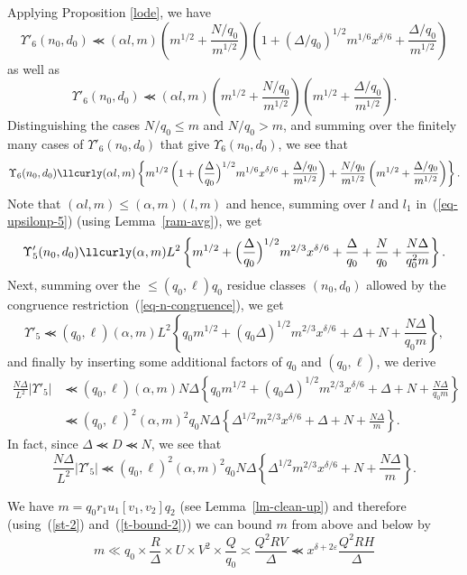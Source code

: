 \documentclass[12pt,a4paper,reqno]{amsart}
\numberwithin{equation}{section}
\theoremstyle{plain}
\theoremstyle{definition}
\newcommand\eps{\varepsilon}
\renewcommand{\sim}{\asymp}
\renewcommand{\lessapprox}{\llcurly}
\begin{document}
Applying Proposition \ref{lode}, we have
$$
\Upsilon'_6(n_0,d_0)\lessapprox (\alpha l,m) \left(m^{1/2} +
  \frac{N/q_0}{m^{1/2}}\right) \left( 1 + (\Delta/q_0)^{1/2} m^{1/6}
  x^{\delta/6} + \frac{\Delta/q_0}{m^{1/2}}\right)
$$
as well as
$$
\Upsilon'_6(n_0,d_0)\lessapprox (\alpha l,m) \left(m^{1/2} +
  \frac{N/q_0}{m^{1/2}}\right) \left(m^{1/2} +
  \frac{\Delta/q_0}{m^{1/2}}\right).
$$ 
Distinguishing the cases $N/q_0 \leq m$ and $N/q_0 > m$, and summing
over the finitely many cases of $\Upsilon'_6(n_0,d_0)$ that give
$\Upsilon_6(n_0,d_0)$, we see that
$$
\Upsilon_6(n_0,d_0)\lessapprox (\alpha l,m) \left\{ m^{1/2} \left( 1 +
    \Bigl(\frac{\Delta}{q_0}\Bigr)^{1/2} m^{1/6} x^{\delta/6} +
    \frac{\Delta/q_0}{m^{1/2}}\right) + \frac{N/q_0}{m^{1/2}}
  \left(m^{1/2} + \frac{\Delta/q_0}{m^{1/2}}\right)\right\}.
$$
Note that $(\alpha l,m)\leq (\alpha,m)(l,m)$ and hence, summing over $l$ and
$l_1$ in~(\ref{eq-upsilonp-5}) (using Lemma~\ref{ram-avg}), we get
$$
\Upsilon'_5(n_0,d_0)\lessapprox (\alpha,m)L^2 \left\{ m^{1/2} +
  \Bigl(\frac{\Delta}{q_0}\Bigr)^{1/2} m^{2/3} x^{\delta/6} +
  \frac{\Delta}{q_0} + \frac{N}{q_0} + \frac{N\Delta}{q_0^2m}\right\}.
$$
Next, summing over the $\leq (q_0,\ell)q_0$ residue classes $(n_0,d_0)$
allowed by the congruence restriction~(\ref{eq-n-congruence}), we get
$$
\Upsilon'_5\lessapprox (q_0,\ell)
(\alpha,m)L^2 \left\{ q_0m^{1/2} + (q_0\Delta)^{1/2} m^{2/3} x^{\delta/6} +
  \Delta + N + \frac{N\Delta}{q_0m}\right\},
$$
and finally by  inserting some additional factors of $q_0$ and $(q_0,\ell)$, we derive
\begin{align*}
\frac{N\Delta}{L^2} | \Upsilon'_5| &\lessapprox (q_0,\ell)(\alpha,m)N\Delta \left\{ q_0m^{1/2} +
    (q_0\Delta)^{1/2} m^{2/3} x^{\delta/6} + \Delta + N +
    \frac{N\Delta}{q_0m}\right\}\\
  &\lessapprox (q_0,\ell)^2(\alpha,m)^2q_0N\Delta \left\{ \Delta^{1/2}
    m^{2/3} x^{\delta/6} + \Delta + N + \frac{N\Delta}{m}\right\}.
\end{align*}
In fact, since $\Delta \lessapprox D \lessapprox N$, we see
that
$$
\frac{N\Delta}{L^2} | \Upsilon'_5| \lessapprox (q_0,\ell)^2(\alpha,m)^2q_0N\Delta \left\{
  \Delta^{1/2} m^{2/3} x^{\delta/6} + N + \frac{N\Delta}{m}\right\}.
$$
\par
We have $m=q_0r_1u_1[v_1,v_2]q_2$ (see Lemma~\ref{lm-clean-up}) and
therefore (using~(\ref{st-2}) and~(\ref{t-bound-2})) we can bound $m$
from above and below by
$$
m\ll q_0\times\frac{R}{\Delta}\times U\times V^2\times
\frac{Q}{q_0}\sim \frac{Q^2RV}{\Delta}\lessapprox
x^{\delta+2\eps}\frac{Q^2RH}{\Delta}
$$
\end{document}
